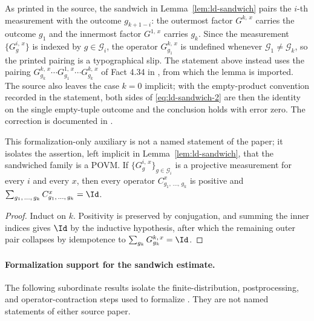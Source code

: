\begin{remark}\label{rem:ld-sandwich-indexing}
	As printed in the source, the sandwich in Lemma~\ref{lem:ld-sandwich} pairs the $i$-th measurement with the outcome $g_{k+1-i}$: the outermost factor $G^{k,\,x}$ carries the outcome $g_1$ and the innermost factor $G^{1,\,x}$ carries $g_k$. Since the measurement $\{G^{i,\,x}_g\}$ is indexed by $g \in \mathcal G_i$, the operator $G^{k,\,x}_{g_1}$ is undefined whenever $\mathcal G_1 \ne \mathcal G_k$, so the printed pairing is a typographical slip. The statement above instead uses the pairing $G^{k,\,x}_{g_k} \cdots G^{1,\,x}_{g_1} \cdots G^{k,\,x}_{g_k}$ of Fact 4.34 in \cite{Natarajan2018NEEXP}, from which the lemma is imported. The source also leaves the case $k = 0$ implicit; with the empty-product convention recorded in the statement, both sides of \eqref{eq:ld-sandwich-2} are then the identity on the single empty-tuple outcome and the conclusion holds with error zero.  The correction is documented in \cite{gap:qpbt_ld-sandwich-indexing}.
\end{remark}

\begin{lemma}
	\label{lem:ld-sandwich-measurement}
	\leanok
	This formalization-only auxiliary is not a named statement of the paper; it
	isolates the assertion, left implicit in Lemma~\ref{lem:ld-sandwich}, that
	the sandwiched family is a POVM. If $\{G^{i,\,x}_g\}_{g \in \mathcal G_i}$
	is a projective measurement for every $i$ and every $x$, then every
	operator $C^x_{g_1,\,\dots,\,g_k}$ is positive and
	$\sum_{g_1,\,\dots,\,g_k} C^x_{g_1,\,\dots,\,g_k} = \Id$.
\end{lemma}
\begin{proof}
	\leanok {}
	Induct on $k$. Positivity is preserved by conjugation, and summing the
	inner indices gives $\Id$ by the inductive hypothesis, after which the
	remaining outer pair collapses by idempotence to
	$\sum_{g_k} G^{k,\,x}_{g_k} = \Id$.
\end{proof}

\paragraph{Formalization support for the sandwich estimate.}
The following subordinate results isolate the finite-distribution,
postprocessing, and operator-contraction steps used to formalize
\cite[Fact~4.34]{Natarajan2018NEEXP}. They are not named statements of either source paper.

